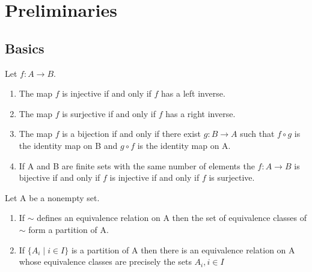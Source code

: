 \documentclass[../main]{subfiles}
\begin{document}
 
 \section{Preliminaries}
 
 \subsection{Basics}
 
 \begin{prop}
  Let $f \colon A \to B.$
  \begin{enumerate}
   \item The map $f$ is injective if and only if $f$ has a left inverse.
   \item The map $f$ is surjective if and only if $f$ has a right inverse.
   \item The map $f$ is a bijection if and only if there exist $g \colon B \to A$ such that $f\circ g$ is the identity map on B and $g\circ f$ is the identity map on A.
   \item If A and B are finite sets with the same number of elements the $f\colon A \to B$ is bijective if and only if $f$ is injective if and only if $f$ is surjective.
  \end{enumerate}
 \end{prop}

 \begin{prop}
  Let A be a nonempty set.
  \begin{enumerate}
   \item If $\sim$ defines an equivalence relation on A then the set of equivalence classes of $\sim$ form a partition of A.
   \item If $\{A_i \mid i \in I\}$ is a partition of A then there is an equivalence relation on A whose equivalence classes are precisely the sets $A_i, i\in I$
  \end{enumerate}
 \end{prop}
 
\end{document}
